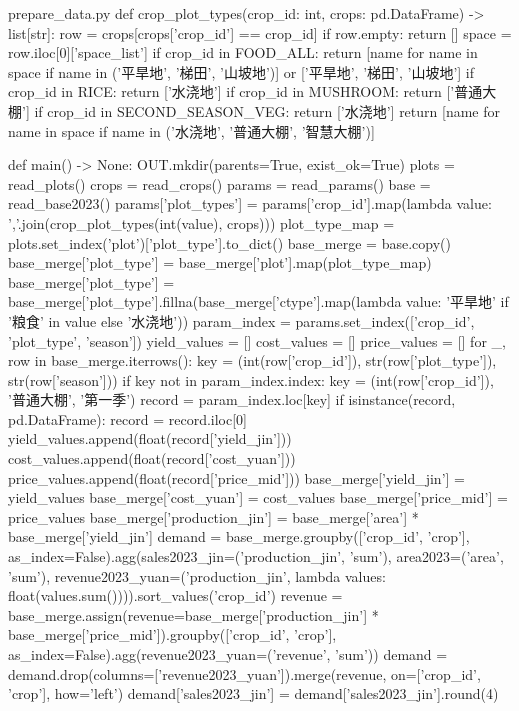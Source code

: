\documentclass[bwprint]{gmcmthesis}
\begin{document}
\begin{appendices}
\begin{Python}{prepare\_data.py}
def crop_plot_types(crop_id: int, crops: pd.DataFrame) -> list[str]:
    row = crops[crops['crop_id'] == crop_id]
    if row.empty:
        return []
    space = row.iloc[0]['space_list']
    if crop_id in FOOD_ALL:
        return [name for name in space if name in ('平旱地', '梯田', '山坡地')] or ['平旱地', '梯田', '山坡地']
    if crop_id in RICE:
        return ['水浇地']
    if crop_id in MUSHROOM:
        return ['普通大棚']
    if crop_id in SECOND_SEASON_VEG:
        return ['水浇地']
    return [name for name in space if name in ('水浇地', '普通大棚', '智慧大棚')]

def main() -> None:
    OUT.mkdir(parents=True, exist_ok=True)
    plots = read_plots()
    crops = read_crops()
    params = read_params()
    base = read_base2023()
    params['plot_types'] = params['crop_id'].map(lambda value: ','.join(crop_plot_types(int(value), crops)))
    plot_type_map = plots.set_index('plot')['plot_type'].to_dict()
    base_merge = base.copy()
    base_merge['plot_type'] = base_merge['plot'].map(plot_type_map)
    base_merge['plot_type'] = base_merge['plot_type'].fillna(base_merge['ctype'].map(lambda value: '平旱地' if '粮食' in value else '水浇地'))
    param_index = params.set_index(['crop_id', 'plot_type', 'season'])
    yield_values = []
    cost_values = []
    price_values = []
    for _, row in base_merge.iterrows():
        key = (int(row['crop_id']), str(row['plot_type']), str(row['season']))
        if key not in param_index.index:
            key = (int(row['crop_id']), '普通大棚', '第一季')
        record = param_index.loc[key]
        if isinstance(record, pd.DataFrame):
            record = record.iloc[0]
        yield_values.append(float(record['yield_jin']))
        cost_values.append(float(record['cost_yuan']))
        price_values.append(float(record['price_mid']))
    base_merge['yield_jin'] = yield_values
    base_merge['cost_yuan'] = cost_values
    base_merge['price_mid'] = price_values
    base_merge['production_jin'] = base_merge['area'] * base_merge['yield_jin']
    demand = base_merge.groupby(['crop_id', 'crop'], as_index=False).agg(sales2023_jin=('production_jin', 'sum'), area2023=('area', 'sum'), revenue2023_yuan=('production_jin', lambda values: float(values.sum()))).sort_values('crop_id')
    revenue = base_merge.assign(revenue=base_merge['production_jin'] * base_merge['price_mid']).groupby(['crop_id', 'crop'], as_index=False).agg(revenue2023_yuan=('revenue', 'sum'))
    demand = demand.drop(columns=['revenue2023_yuan']).merge(revenue, on=['crop_id', 'crop'], how='left')
    demand['sales2023_jin'] = demand['sales2023_jin'].round(4)

\end{Python}
\end{appendices}
\end{document}
